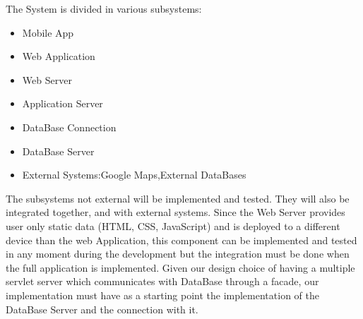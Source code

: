 
The System is divided in various subsystems:
\begin{itemize}
\item Mobile App
\item Web Application
\item Web Server
\item Application Server
\item DataBase Connection
\item DataBase Server 
\item External Systems:Google Maps,External DataBases
\end{itemize}
The subsystems not external will be implemented and tested. They will also be integrated together, and with external systems. Since the Web Server provides user only static data (HTML, CSS, JavaScript) and is deployed to a different device than the web Application, this component can be implemented and tested in any moment during the development but the integration must be done when the full application is implemented. Given our design choice of having a multiple servlet server which communicates with DataBase through a facade, our implementation must have as a starting point the implementation of the DataBase Server and the connection with it.
